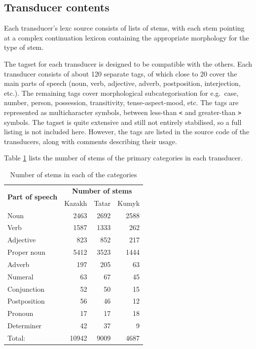 \documentclass[a4paper,11pt,twocolumn]{article}
\begin{document}

\subsection{Transducer contents}

Each transducer's lexc source consists of lists of stems, with each stem pointing at a complex continuation lexicon containing the appropriate morphology for the type of stem.  

The tagset for each transducer is designed to be compatible with the others.  Each transducer consists of about 120 separate tags, of which close to 20 cover the main parts of speech (noun, verb, adjective, adverb, postposition, interjection, etc.).  The remaining tags cover morphological subcategorisation for e.g.\ case, number, person, possession, transitivity, tense-aspect-mood, etc.  The tags are represented as multicharacter symbols, between less-than \texttt{<} and greater-than \texttt{>} symbols.  The tagset is quite extensive and still not entirely stabilised, so a full listing is not included here.  However, the tags are listed in the source code of the transducers, along with comments describing their usage.


Table \ref{table:stems} lists the number of stems of the primary categories in each transducer.

\begin{table}
\begin{center}
\begin{tabular}{lrrr}
		\toprule
\multirow{2}{*}{\textbf{Part of speech}} & \multicolumn{3}{c}{\textbf{Number of stems}} \\ \cline{2-4}
                        & Kazakh & Tatar & Kumyk \\
		\midrule
		Noun & 2463 & 2692 & 2588 \\
		Verb & 1587 & 1333 & 262 \\
		Adjective & 823 & 852 & 217 \\
		Proper noun & 5412 & 3523 & 1444 \\
		Adverb & 197 & 205 & 63 \\
		Numeral & 63 & 67 & 45 \\
		Conjunction & 52 & 50 & 15 \\
		Postposition & 56 & 46 & 12 \\
		Pronoun & 17 & 17 & 18 \\
		Determiner & 42 & 37 & 9 \\
		\midrule
		Total: & 10942 & 9009 & 4687 \\
		\bottomrule
\end{tabular}
 \caption{Number of stems in each of the categories}
 \label{table:stems}
\end{center}

\end{table}
\end{document}

